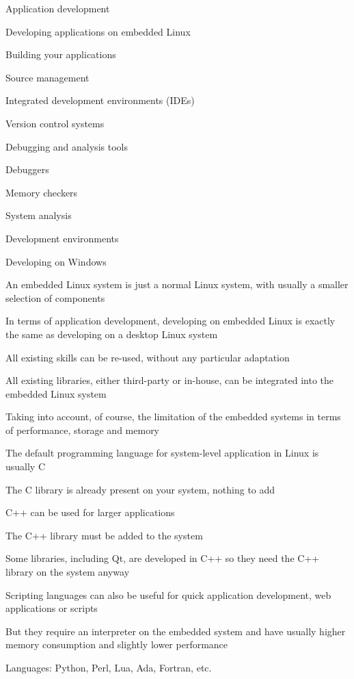 
  \startitemize
  \item Application development
    \startitemize
    \item Developing applications on embedded Linux
    \item Building your applications
    \stopitemize
  \item Source management
    \startitemize
    \item Integrated development environments (IDEs)
    \item Version control systems
    \stopitemize
  \item Debugging and analysis tools
    \startitemize
    \item Debuggers
    \item Memory checkers
    \item System analysis
    \stopitemize
  \item Development environments
    \startitemize
    \item Developing on Windows
    \stopitemize
  \stopitemize


  \startitemize
  \item An embedded Linux system is just a normal Linux system, with
    usually a smaller selection of components
  \item In terms of application development, developing on embedded
    Linux is exactly the same as developing on a desktop Linux system
  \item All existing skills can be re-used, without any particular
    adaptation
  \item All existing libraries, either third-party or in-house, can be
    integrated into the embedded Linux system
    \startitemize
    \item Taking into account, of course, the limitation of the
      embedded systems in terms of performance, storage and memory
    \stopitemize
  \stopitemize

  \startitemize
  \item The default programming language for system-level application
    in Linux is usually C
    \startitemize
    \item The C library is already present on your system, nothing to
      add
    \stopitemize
  \item C++ can be used for larger applications
    \startitemize
    \item The C++ library must be added to the system
    \item Some libraries, including Qt, are developed in C++ so they
      need the C++ library on the system anyway
    \stopitemize
  \item Scripting languages can also be useful for quick application
    development, web applications or scripts
    \startitemize
    \item But they require an interpreter on the embedded system and
      have usually higher memory consumption and slightly lower
      performance
    \stopitemize
  \item Languages: Python, Perl, Lua, Ada, Fortran, etc.
  \stopitemize


